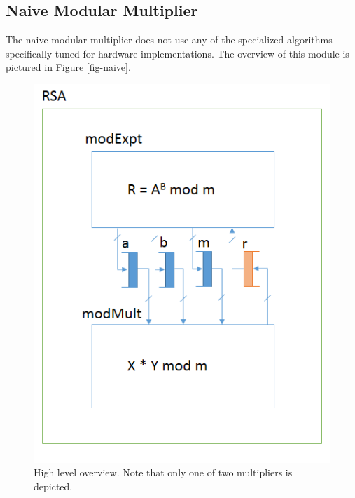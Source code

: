 \documentclass[12pt]{article}
\begin{document}
\subsection{Naive Modular Multiplier}
The naive modular multiplier does not use any of the specialized algorithms
specifically tuned for hardware implementations.
The overview of this module is pictured in Figure \ref{fig-naive}.


\begin{figure}
  \begin{centering}
    \includegraphics[scale=1]{top_level.png}
    \caption{High level overview. Note that only one of two multipliers is depicted.}
    \label{fig-top}
  \end{centering}
\end{figure}
\end{document}
